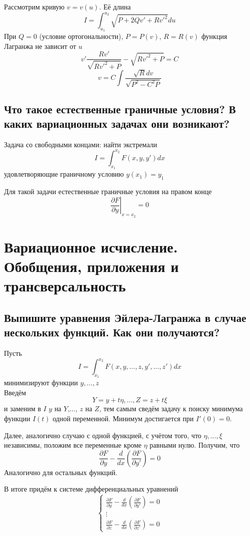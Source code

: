 \documentclass{article}
\newcommand{\Lg}{Лагранжа}
\begin{document}
Рассмотрим кривую $ v = v(u) $. Её длина 
\[ I = \int_{u_1}^{u_2} \sqrt{P+2Qv'+Rv'^2}du \]
При $ Q=0$ (условие ортогональности), $P=P(v)$, $R=R(v) $ функция \Lg{} не зависит от $u$
\[ v'\frac{Rv'}{\sqrt{Rv'^2 + P}}-\sqrt{Rv'^2 + P}=C \]
\[ v=C\int \frac{\sqrt{R}dv}{\sqrt{P^2 -C^2P}} \]

\subsection{Что такое естественные граничные условия? В каких вариационных задачах они возникают?}
Задача со свободными концами: найти экстремали \[ I = \int_{x_1}^{x_2}F(x,y,y')dx \] удовлетворяющие граничному условию $y(x_1)=y_1$

Для такой задачи естественные граничные условия на правом конце
\[ \left. \frac{\partial F}{\partial y} \right|_{x=x_2} = 0 \]


\section{Вариационное исчисление. Обобщения, приложения и трансверсальность}
\subsection{Выпишите уравнения Эйлера-Лагранжа в случае нескольких функций. Как они получаются?}
Пусть 
\[ I=\int_{x_1}^{x_2} F(x, y,..., z, y', ..., z')dx \]
минимизируют функции $y, ..., z$\\
Введём 
\[ Y=y+t\eta, ..., Z=z+t\xi \]
и заменим в $I$ $y$ на $Y$,..., $z$ на $Z$, тем самым сведём задачу к поиску минимума функции $ I(t) $ одной переменной. 
Минимум достигается при $ I'(0)=0 $.

Далее, аналогично случаю с одной функцией, с учётом того, что $\eta, ..., \xi$ независимы, 
положим все переменные кроме $\eta$ равными нулю. Получим, что
\[ \frac{\partial F}{\partial y} - \frac{d}{dx}\left(\frac{\partial F}{\partial y'}\right)=0 \] 
Аналогично для остальных функций.

В итоге придём к системе дифференциальных уравнений 
\[ \left\{
	\begin{matrix}
		\frac{\partial F}{\partial y} - \frac{d}{dx}\left(\frac{\partial F}{\partial y'}\right)=0\\ 
		\vdots \\
		\frac{\partial F}{\partial z} - \frac{d}{dx}\left(\frac{\partial F}{\partial z'}\right)=0
	\end{matrix}
\right. \]
\end{document}
